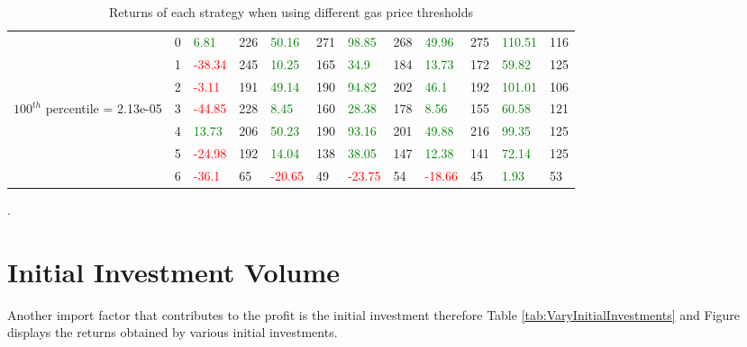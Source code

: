 \begin{table}[htb!]
\begin{adjustwidth}{-0.9in}{-0.9in}
\begin{tabular}{|p{5em}|p{2em}|p{3em}|p{3em}|p{3em}|p{3em}|p{3em}|p{3em}|p{3em}|p{3em}|p{3em}|p{3em}|}
            & 0 & \textcolor{green}{6.81} & 226 & \textcolor{green}{50.16} & 271 & \textcolor{green}{98.85} & 268 & \textcolor{green}{49.96} & 275 & \textcolor{green}{110.51} & 116\\\cline{3-12}
            & 1 & \textcolor{red}{-38.34} & 245 & \textcolor{green}{10.25} & 165 & \textcolor{green}{34.9} & 184 & \textcolor{green}{13.73} & 172 & \textcolor{green}{59.82} & 125\\\cline{3-12}
            & 2 & \textcolor{red}{-3.11} & 191 & \textcolor{green}{49.14} & 190 & \textcolor{green}{94.82} & 202 & \textcolor{green}{46.1} & 192 & \textcolor{green}{101.01} & 106\\\cline{3-12}
            $100^{th}$ percentile = 2.13e-05 & 3 & \textcolor{red}{-44.85} & 228 & \textcolor{green}{8.45} & 160 & \textcolor{green}{28.38} & 178 & \textcolor{green}{8.56} & 155 & \textcolor{green}{60.58} & 121\\\cline{3-12}
            & 4 & \textcolor{green}{13.73} & 206 & \textcolor{green}{50.23} & 190 & \textcolor{green}{93.16} & 201 & \textcolor{green}{49.88} & 216 & \textcolor{green}{99.35} & 125\\\cline{3-12}
            & 5 & \textcolor{red}{-24.98} & 192 & \textcolor{green}{14.04} & 138 & \textcolor{green}{38.05} & 147 & \textcolor{green}{12.38} & 141 & \textcolor{green}{72.14} & 125\\\cline{3-12}
            & 6 & \textcolor{red}{-36.1} & 65 & \textcolor{red}{-20.65} & 49 & \textcolor{red}{-23.75} & 54 & \textcolor{red}{-18.66} & 45 & \textcolor{green}{1.93} & 53\\\hline
        \end{tabular}
    \end{adjustwidth}
    \caption{Returns of each strategy when using different gas price thresholds \label{tab:VaryGasPriceThresholds}}.
\end{table}

\section{Initial Investment Volume}
Another import factor that contributes to the profit is the initial investment therefore Table \ref{tab:VaryInitialInvestments} and Figure  displays the returns obtained by various initial investments. 

